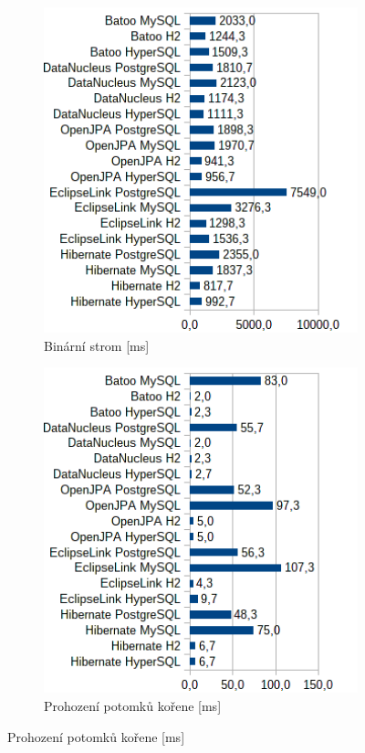 \begin{figure}[!h]\ContinuedFloat
  \begin{subfigure}[b]{1\textwidth}
  \includegraphics[width=25em]{obr/bench/jpa9}
  \caption{Binární strom [ms]}\label{img:jpa9}
  \end{subfigure}
  \begin{subfigure}[b]{1\textwidth}
  \includegraphics[width=25em]{obr/bench/jpa10}
  \caption{Prohození potomků kořene [ms]}\label{img:jpa10}
  \end{subfigure}
\end{figure}

